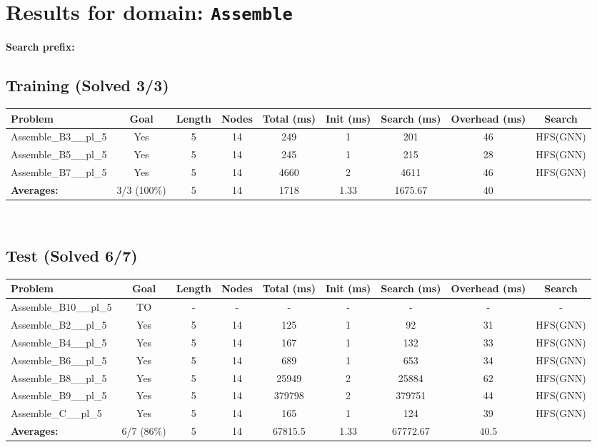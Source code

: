 \documentclass{article}
\begin{document}
\section*{Results for domain: \texttt{Assemble}}
\textbf{Search prefix:} 
\\[0.5cm]
\subsection*{Training (Solved 3/3)}
\begin{tabular}{lcccccccc}
\toprule
Problem & Goal & Length & Nodes & Total (ms) & Init (ms) & Search (ms) & Overhead (ms) & Search \\
\midrule
Assemble\_B3\_\_pl\_5 & Yes & 5 & 14 & 249 & 1 & 201 & 46 & HFS(GNN) \\
Assemble\_B5\_\_pl\_5 & Yes & 5 & 14 & 245 & 1 & 215 & 28 & HFS(GNN) \\
Assemble\_B7\_\_pl\_5 & Yes & 5 & 14 & 4660 & 2 & 4611 & 46 & HFS(GNN) \\
\textbf{Averages:} & 3/3 (100\%) & 5 & 14 & 1718 & 1.33 & 1675.67 & 40 & \\
\bottomrule
\end{tabular}
\\[0.7cm]
\subsection*{Test (Solved 6/7)}
\begin{tabular}{lcccccccc}
\toprule
Problem & Goal & Length & Nodes & Total (ms) & Init (ms) & Search (ms) & Overhead (ms) & Search \\
\midrule
Assemble\_B10\_\_pl\_5 & TO & - & - & - & - & - & - & - \\
Assemble\_B2\_\_pl\_5 & Yes & 5 & 14 & 125 & 1 & 92 & 31 & HFS(GNN) \\
Assemble\_B4\_\_pl\_5 & Yes & 5 & 14 & 167 & 1 & 132 & 33 & HFS(GNN) \\
Assemble\_B6\_\_pl\_5 & Yes & 5 & 14 & 689 & 1 & 653 & 34 & HFS(GNN) \\
Assemble\_B8\_\_pl\_5 & Yes & 5 & 14 & 25949 & 2 & 25884 & 62 & HFS(GNN) \\
Assemble\_B9\_\_pl\_5 & Yes & 5 & 14 & 379798 & 2 & 379751 & 44 & HFS(GNN) \\
Assemble\_C\_\_pl\_5 & Yes & 5 & 14 & 165 & 1 & 124 & 39 & HFS(GNN) \\
\textbf{Averages:} & 6/7 (86\%) & 5 & 14 & 67815.5 & 1.33 & 67772.67 & 40.5 & \\
\bottomrule
\end{tabular}
\\[0.7cm]
\end{document}
